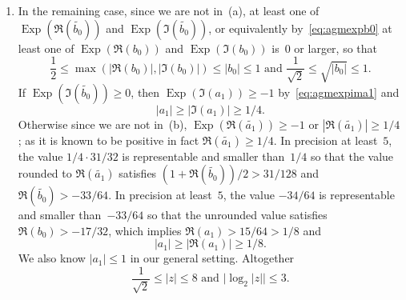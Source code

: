 \documentclass [11pt]{article}
\newcommand {\appro}[1]{\widetilde {#1}}
\DeclareMathOperator{\Exp}{\operatorname {Exp}}
\renewcommand {\leq}{\leqslant}
\renewcommand {\geq}{\geqslant}
\begin{document}
\begin {enumerate}
Putting these together, we obtain
\[
1/2 \leq |\Re (b_0)| \leq |b_0|
\text { or }
1 / \sqrt 2 \leq |\sqrt {b_0}|,
\text { and }
|a_1| \leq \sqrt 2 / 4,
\]
and we already know
\[
|b_0| \leq 1 \text { or } |\sqrt {b_0}| \leq 1
\]
from our general setting and
\[
|a_1| \geq |\appro {a_1}| / \sqrt 2
\]
by~\eqref {eq:agmabsb0a1}, whence
\[
2 \leq |z| \leq \frac {\sqrt 2}{|\appro {a_1}|}
\text {and }
\big| \log_2 |z| \big| \leq
- \log_2 \left| \appro {a_1} \right| + \frac {1}{2}.
\]
Using the estimate
\[
\left| \appro {a_1} \right|
\geq \max \left( |\Re (\appro {a_1})|, |\Im (\appro {a_1})| \right)
\geq
2^{\max \left( \Exp (\Re (\appro {a_1})), \Exp (\Im (\appro {a_1})) \right)
- 1}
\]
and~\eqref {eq:agmexpima1} we finally obtain
\begin {equation}
\label {eq:agmla}
\big| \log_2 |z| \big| \leq
- \max \left( \Exp (\Re (\appro {a_1})), \Exp (\Im (\appro {b_0})) - 1 \right)
+ \frac {3}{2}.
\end {equation}

\item
In the remaining case, since we are not in~(a), at least one of
$\Exp \left( \Re (\appro {b_0}) \right)$ and
$\Exp \left( \Im (\appro {b_0}) \right)$,
or equivalently by~\eqref {eq:agmexpb0} at least one of
$\Exp (\Re (b_0))$ and $\Exp (\Im (b_0))$
is~$0$ or larger, so that
\[
\frac {1}{2} \leq \max (|\Re (b_0)|, |\Im (b_0)|)
\leq |b_0| \leq 1 \text { and }
\frac {1}{\sqrt 2} \leq \sqrt {|b_0|} \leq 1.
\]
If $\Exp \left( \Im (\appro {b_0}) \right) \geq 0$, then
$\Exp (\Im (a_1)) \geq -1$ by~\eqref {eq:agmexpima1}
and
\[
|a_1| \geq |\Im (a_1)| \geq 1/4.
\]
Otherwise since we are not in~(b),
$\Exp (\Re (\appro {a_1})) \geq -1$ or
$|\Re (\appro {a_1})| \geq 1/4$;
as it is known to be positive in fact
$\Re (\appro {a_1}) \geq 1/4$.
In precision at least~$5$, the value $1/4 \cdot 31/32$
is representable and smaller than~$1/4$ so that the value rounded
to $\Re (\appro {a_1})$ satisfies
$(1 + \Re (\appro {b_0})) / 2 > 31/128$ and
$\Re (\appro {b_0}) > -33/64$.
In precision at least~$5$, the value $-34/64$
is representable and smaller than~$-33/64$ so that the unrounded
value satisfies
$\Re (b_0) > -17/32$,
which implies $\Re (a_1) > 15/64 > 1/8$ and
\[
|a_1| \geq |\Re (a_1)| \geq 1/8.
\]
We also know $|a_1| \leq 1$ in our general setting.
Altogether
\begin {equation}
\label {eq:agml}
\frac {1}{\sqrt 2} \leq |z| \leq 8
\text { and }
\big| \log_2 |z| \big| \leq 3.
\end {equation}
\end {enumerate}
\end{document}
